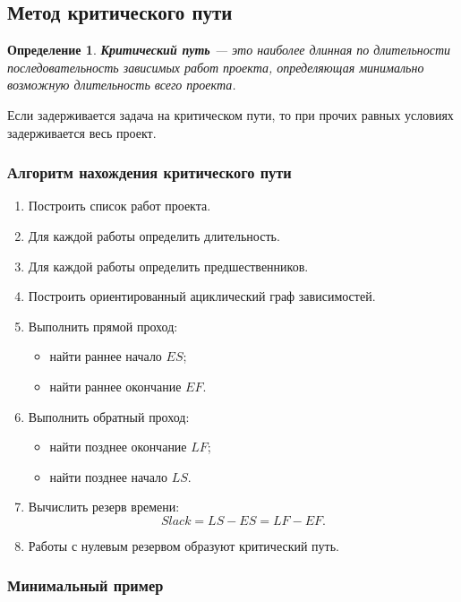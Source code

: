 \documentclass[12pt,a4paper]{article}
\newtheorem{definition}{Определение}
\begin{document}
\subsection{Метод критического пути}

\begin{definition}
\textbf{Критический путь} --- это наиболее длинная по длительности последовательность зависимых работ проекта, определяющая минимально возможную длительность всего проекта.
\end{definition}

Если задерживается задача на критическом пути, то при прочих равных условиях задерживается весь проект.

\subsubsection*{Алгоритм нахождения критического пути}

\begin{enumerate}
    \item Построить список работ проекта.
    \item Для каждой работы определить длительность.
    \item Для каждой работы определить предшественников.
    \item Построить ориентированный ациклический граф зависимостей.
    \item Выполнить прямой проход:
    \begin{itemize}
        \item найти раннее начало $ES$;
        \item найти раннее окончание $EF$.
    \end{itemize}
    \item Выполнить обратный проход:
    \begin{itemize}
        \item найти позднее окончание $LF$;
        \item найти позднее начало $LS$.
    \end{itemize}
    \item Вычислить резерв времени:
    \[
    Slack = LS - ES = LF - EF.
    \]
    \item Работы с нулевым резервом образуют критический путь.
\end{enumerate}

\subsubsection*{Минимальный пример}
\end{document}
